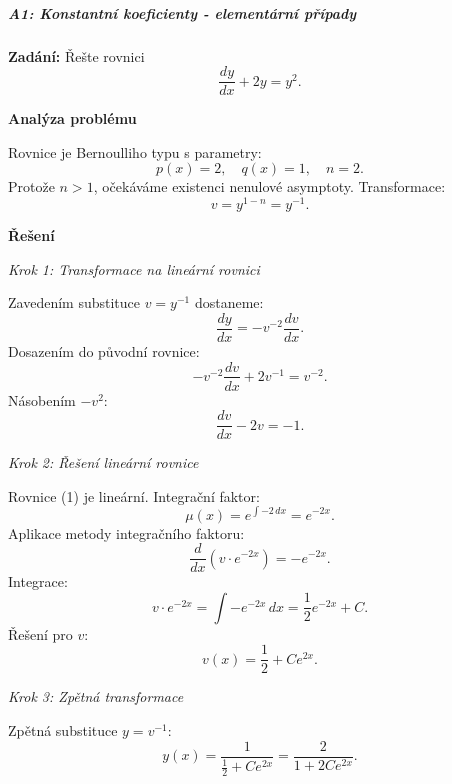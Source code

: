 \subparagraph*{A1: Konstantní koeficienty - elementární případy}
\label{subpar:l2-a1-konstantni-koeficienty}

\begin{example}
    \label{ex:l2-a1-lehky-zakladni}
    
    \noindent\textbf{Zadání:} Řešte rovnici
    \[
    \frac{dy}{dx} + 2y = y^2.
    \]
    
    \vspace{1.5\baselineskip}
    
    \noindent\textbf{Analýza problému}
    
    \noindent Rovnice je Bernoulliho typu s parametry:
    \[
    p(x) = 2, \quad q(x) = 1, \quad n = 2.
    \]
    Protože $n > 1$, očekáváme existenci nenulové asymptoty. Transformace:
    \[
    v = y^{1-n} = y^{-1}.
    \]
    
    \vspace{1.5\baselineskip}
    
    \noindent\textbf{Řešení}
    
    \noindent\textit{Krok 1: Transformace na lineární rovnici}
    
    Zavedením substituce $v = y^{-1}$ dostaneme:
    \[
    \frac{dy}{dx} = -v^{-2}\frac{dv}{dx}.
    \]
    Dosazením do původní rovnice:
    \[
    -v^{-2}\frac{dv}{dx} + 2v^{-1} = v^{-2}.
    \]
    Násobením $-v^2$:
    \[
    \frac{dv}{dx} - 2v = -1. \tag{1}
    \]
    
    \vspace{1\baselineskip}
    
    \noindent\textit{Krok 2: Řešení lineární rovnice}
    
    Rovnice (1) je lineární. Integrační faktor:
    \[
    \mu(x) = e^{\int -2\,dx} = e^{-2x}.
    \]
    Aplikace metody integračního faktoru:
    \[
    \frac{d}{dx}(v \cdot e^{-2x}) = -e^{-2x}.
    \]
    Integrace:
    \[
    v \cdot e^{-2x} = \int -e^{-2x}\,dx = \frac{1}{2}e^{-2x} + C.
    \]
    Řešení pro $v$:
    \[
    v(x) = \frac{1}{2} + Ce^{2x}. \tag{2}
    \]
    
    \vspace{1\baselineskip}
    
    \noindent\textit{Krok 3: Zpětná transformace}
    
    Zpětná substituce $y = v^{-1}$:
    \[
    y(x) = \frac{1}{\frac{1}{2} + Ce^{2x}} = \frac{2}{1 + 2Ce^{2x}}. \tag{3}
    \]
    
    \vspace{1.5\baselineskip}
    

\end{example}
